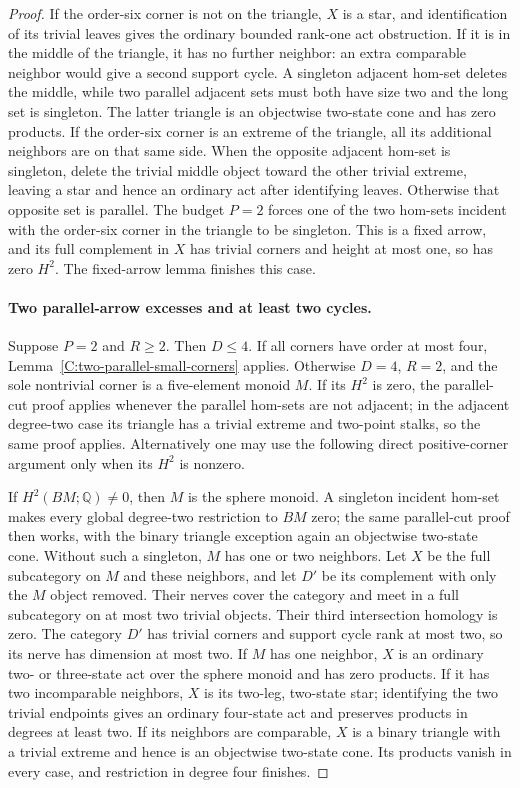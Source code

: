 \begin{proof}
If the order-six corner is not on the triangle, $X$
is a star, and identification of its trivial leaves
gives the ordinary bounded rank-one act obstruction.
If it is in the middle of the triangle, it has no
further neighbor: an extra comparable neighbor would
give a second support cycle.  A singleton adjacent
hom-set deletes the middle, while two parallel
adjacent sets must both have size two and the long
set is singleton.  The latter triangle is an
objectwise two-state cone and has zero products.
If the order-six corner is an extreme of the triangle,
all its additional neighbors are on that same side.
When the opposite adjacent hom-set is singleton,
delete the trivial middle object toward the other
trivial extreme, leaving a star and hence an ordinary
act after identifying leaves.  Otherwise that opposite
set is parallel.  The budget $P=2$ forces one of the
two hom-sets incident with the order-six corner in
the triangle to be singleton.  This is a fixed arrow,
and its full complement in $X$ has trivial corners
and height at most one, so has zero $H^2$.
The fixed-arrow lemma finishes this case.

\paragraph{Two parallel-arrow excesses and at least two cycles.}
Suppose $P=2$ and $R\geq2$.  Then $D\leq4$.
If all corners have order at most four,
Lemma~\ref{C:two-parallel-small-corners} applies.
Otherwise $D=4$, $R=2$, and the sole nontrivial corner
is a five-element monoid $M$.  If its $H^2$ is zero,
the parallel-cut proof applies whenever the parallel
hom-sets are not adjacent; in the adjacent degree-two
case its triangle has a trivial extreme and two-point
stalks, so the same proof applies.  Alternatively one
may use the following direct positive-corner argument
only when its $H^2$ is nonzero.

If $H^2(BM;\mathbb Q)\ne0$, then $M$ is the sphere
monoid.  A singleton incident hom-set makes every
global degree-two restriction to $BM$ zero; the same
parallel-cut proof then works, with the binary triangle
exception again an objectwise two-state cone.
Without such a singleton, $M$ has one or two neighbors.
Let $X$ be the full subcategory on $M$ and these neighbors,
and let $D'$ be its complement with only the $M$ object
removed.  Their nerves cover the category and meet in
a full subcategory on at most two trivial objects.
Their third intersection homology is zero.
The category $D'$ has trivial corners and support cycle
rank at most two, so its nerve has dimension at most two.
If $M$ has one neighbor, $X$ is an ordinary two- or
three-state act over the sphere monoid and has zero
products.  If it has two incomparable neighbors, $X$
is its two-leg, two-state star; identifying the two
trivial endpoints gives an ordinary four-state act
and preserves products in degrees at least two.
If its neighbors are comparable, $X$ is a binary
triangle with a trivial extreme and hence is an
objectwise two-state cone.  Its products vanish in
every case, and restriction in degree four finishes.


\end{proof}
